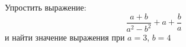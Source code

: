 \begin{ex}
	\begin{condition}
		Упростить выражение:
		\[ \dfrac{a+b}{a^2-b^2}+a+\dfrac{b}{a} \]
		и найти значение выражения при \( a=3 \), \( b=4 \)
	\end{condition}
\end{ex}